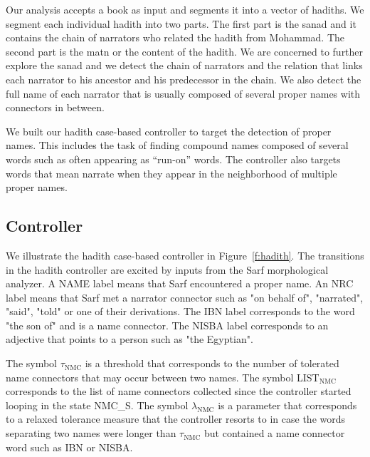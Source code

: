 \documentclass[11pt,letterpaper]{article}
\begin{document}

Our analysis accepts a book as input
and segments it into a vector of hadiths. 
We segment each individual hadith into two parts. 
The first part is the sanad and it
contains the chain of narrators who related the hadith
from Mohammad. 
The second part is the matn or the content
of the hadith. 
We are concerned to further explore the sanad and
we detect the chain of narrators and 
the relation that links each narrator to his ancestor and 
his predecessor in the chain. 
We also detect the full name of each narrator that is
usually composed of several proper names with connectors
in between. 

We built our hadith case-based controller to target
the detection of proper names. 
This includes the task of finding compound names 
composed of several words such as  often
appearing as ``run-on'' words.
The controller also targets words that mean narrate when
they appear in the neighborhood of multiple proper names. 

\subsection{Controller}
\label{sec:controller}

We illustrate the hadith case-based controller 
in Figure~\ref{f:hadith}. 
The transitions in the hadith controller are excited
by inputs from the Sarf morphological analyzer. 
A NAME label means that Sarf encountered a proper name.
An NRC label means that Sarf met a narrator connector such as
 "on behalf of",  "narrated",  "said", 
 "told" or one of their derivations. 
The IBN label corresponds to the word  "the son of" and is a name connector.
The NISBA label corresponds to an adjective that points to a person such 
as  "the Egyptian". 

The symbol $\tau_{\mbox{NMC}}$ is a threshold
that corresponds to the number of tolerated name connectors 
that may occur between two names. 
The symbol LIST$_{\mbox{NMC}}$ corresponds to the list 
of name connectors collected since the controller
started looping in the state NMC\_S. 
The symbol $\lambda_{\mbox{NMC}}$ is a parameter 
that corresponds to a relaxed tolerance measure that
the controller resorts to in case the words separating
two names were longer than $\tau_{\mbox{NMC}}$ but 
contained a name connector word such as IBN or NISBA.
\end{document}
